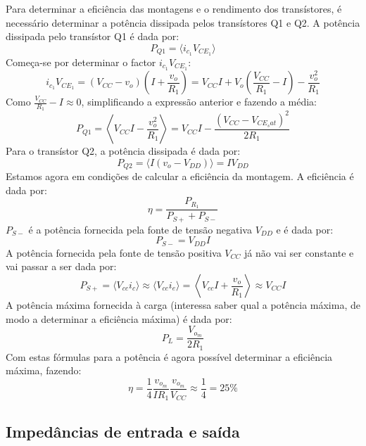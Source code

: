 \documentclass[%
  reprint,
  nofootinbib,
  amsmath,amssymb,
  aps,
  10pt,
  a4paper
]{revtex4-1}
\begin{document}
Para determinar a eficiência das montagens e o rendimento dos transístores, é necessário determinar a potência dissipada pelos transístores Q1 e Q2.
A potência dissipada pelo transístor Q1 é dada por:
\begin{equation}
P_{Q1}=\langle i_{c_1} V_{{CE}_1}\rangle
\end{equation}
Começa-se por determinar o factor $i_{c_1} V_{{CE}_1}$:
\begin{equation}
i_{c_1} V_{{CE}_1}=(V_{CC}-v_o)\left(I+\frac{v_o}{R_1}\right)=V_{CC}I+V_o\left(\frac{V_{CC}}{R_1}-I\right)-\frac{v_o^2}{R_1}
\end{equation}
Como $\frac{V_{CC}}{R_1}-I\approx0$, simplificando a expressão anterior e fazendo a média:
\begin{equation}
P_{Q1}=\left\langle V_{CC}I-\frac{v_o^2}{R_1} \right\rangle=V_{CC}I-\frac{(V_{CC}-V_{{CE}_sat})^2}{2R_1}
\end{equation}
Para o transístor Q2, a potência dissipada é dada por:
\begin{equation}
P_{Q2}=\langle I(v_o-V_{DD}) \rangle=IV_{DD}
\end{equation}
Estamos agora em condições de calcular a eficiência da montagem. A eficiência é dada por:
\begin{equation}
\eta=\frac{P_{R_1}}{P_{S+}+P_{S-}}
\end{equation}
$P_{S-}$ é a potência fornecida pela fonte de tensão negativa $V_{DD}$ e é dada por:
\begin{equation}
P_{S-}=V_{DD}I
\end{equation}
A potência fornecida pela fonte de tensão positiva $V_{CC}$ já não vai ser constante e vai passar a ser dada por:
\begin{equation}
P_{S+}=\langle V_{cc} i_c \rangle \approx \langle V_{cc} i_e \rangle =\left\langle V_{cc} I+\frac{v_o}{R_1} \right\rangle \approx V_{CC}I
\end{equation}
A potência máxima fornecida à carga (interessa saber qual a potência máxima, de modo a determinar a eficiência máxima) é dada por:
\begin{equation}
P_{L}=\frac{V_{o_m}}{2R_1}
\end{equation}
Com estas fórmulas para a potência é agora possível determinar a eficiência máxima, fazendo:
\begin{equation}
\eta=\frac{1}{4}\frac{v_{o_m}}{IR_1}\frac{v_{o_m}}{V_{CC}}\approx\frac{1}{4}=25\%
\end{equation}

\subsection{Impedâncias de entrada e saída}
\end{document}
